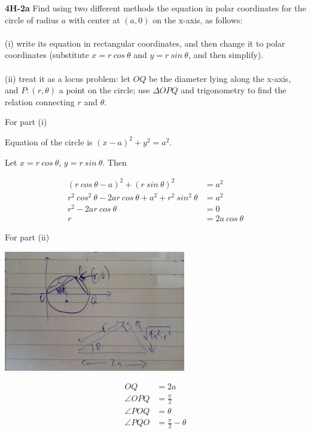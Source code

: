 \documentclass[9pt]{article}
\begin{document}
\begin{tcolorbox}
  \textbf{4H-2a} Find using two different methods the equation in polar coordinates for the circle of radius $a$ with center at $(a, 0)$ on the x-axis, as follows: \\
\\
  (i) write its equation in rectangular coordinates, and then change it to polar coordinates (substitute $x = r\ cos\ \theta$ and $y = r\ sin\ \theta$, and then simplify). \\
\\
  (ii) treat it as a locus problem: let $OQ$ be the diameter lying along the x-axis, and $P: (r, \theta)$ a point on the circle; use $\Delta OPQ$ and trigonometry to find the relation connecting $r$ and $\theta$.
\end{tcolorbox}

For part (i)

Equation of the circle is $(x - a)^2 + y^2 = a^2$.

Let $x = r\ cos\ \theta$, $y = r\ sin\ \theta$. Then

\begin{align*}
  (r\ cos\ \theta - a)^2 + (r\ sin\ \theta)^2 &= a^2 \\
  r^2\ cos^2\ \theta - 2ar\ cos\ \theta + a^2 + r^2\ sin^2\ \theta &= a^2 \\
  r^2 - 2ar\ cos\ \theta &= 0 \\
  r &= 2a\ cos\ \theta
\end{align*}

For part (ii)

\begin{center}
  \includegraphics[scale=0.8]{p1_4h2.jpg}
\end{center}

\begin{align*}
  OQ &= 2a \\
  \angle OPQ &= \frac{\pi}{2} \\
  \angle POQ &= \theta \\
  \angle PQO &= \frac{\pi}{2} - \theta
\end{align*}
\end{document}
